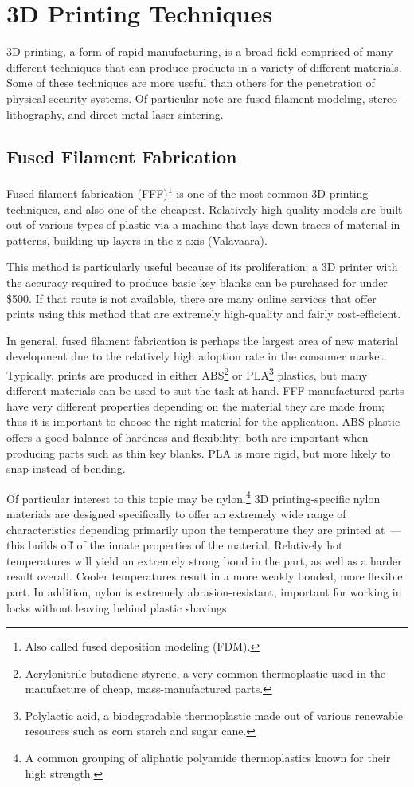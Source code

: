 \documentclass{acm_proc_article-sp}
\begin{document}
\section{3D Printing Techniques}
3D printing, a form of rapid manufacturing, is a broad field comprised of many different techniques that can produce products in a variety of different materials. Some of these techniques are more useful than others for the penetration of physical security systems. Of particular note are fused filament modeling, stereo lithography, and direct metal laser sintering.

\subsection{Fused Filament Fabrication}
Fused filament fabrication (FFF)\footnote{Also called fused deposition modeling (FDM).} is one of the most common 3D printing techniques, and also one of the cheapest. Relatively high-quality models are built out of various types of plastic via a machine that lays down traces of material in patterns, building up layers in the z-axis (Valavaara).

This method is particularly useful because of its proliferation: a 3D printer with the accuracy required to produce basic key blanks can be purchased for under \$500. If that route is not available, there are many online services that offer prints using this method that are extremely high-quality and fairly cost-efficient. 

In general, fused filament fabrication is perhaps the largest area of new material development due to the relatively high adoption rate in the consumer market. Typically, prints are produced in either ABS\footnote{Acrylonitrile butadiene styrene, a very common thermoplastic used in the manufacture of cheap, mass-manufactured parts.} or PLA\footnote{Polylactic acid, a biodegradable thermoplastic made out of various renewable resources such as corn starch and sugar cane.} plastics, but many different materials can be used to suit the task at hand. FFF-manufactured parts have very different properties depending on the material they are made from; thus it is important to choose the right material for the application. ABS plastic offers a good balance of hardness and flexibility; both are important when producing parts such as thin key blanks. PLA is more rigid, but more likely to snap instead of bending.

Of particular interest to this topic may be nylon.\footnote{A common grouping of aliphatic polyamide thermoplastics known for their high strength.} 3D printing-specific nylon materials are designed specifically to offer an extremely wide range of characteristics depending primarily upon the temperature they are printed at~--- this builds off of the innate properties of the material. Relatively hot temperatures will yield an extremely strong bond in the part, as well as a harder result overall. Cooler temperatures result in a more weakly bonded, more flexible part. In addition, nylon is extremely abrasion-resistant, important for working in locks without leaving behind plastic shavings.
\end{document}
